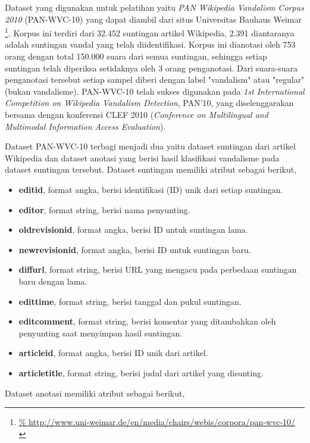 Dataset yang digunakan untuk pelatihan yaitu \textit{PAN Wikipedia Vandalism
Corpus 2010} (PAN-WVC-10)
\parencite{potthast:2010b}
yang dapat diambil dari situs Universitas Bauhaus Weimar
\footnote{%
	\RaggedRight\url{%
http://www.uni-weimar.de/en/media/chairs/webis/corpora/pan-wvc-10/
}}.
Korpus ini terdiri dari 32.452 suntingan artikel Wikipedia, 2.391 diantaranya
adalah suntingan vandal yang telah diidentifikasi.
Korpus ini dianotasi oleh 753 orang dengan total 150.000 suara dari semua
suntingan, sehingga setiap suntingan telah diperiksa setidaknya oleh 3 orang
penganotasi.
Dari suara-suara penganotasi tersebut setiap sampel diberi dengan label
"vandalism" atau "regular" (bukan vandalisme).
PAN-WVC-10 telah sukses digunakan pada \textit{1st International Competition on
Wikipedia Vandalism Detection}, PAN'10, yang diselenggarakan bersama dengan
konferensi CLEF 2010 (\textit{Conference on Multilingual and Multimodal
Information Access Evaluation}).

Dataset PAN-WVC-10 terbagi menjadi dua yaitu dataset suntingan dari artikel
Wikipedia dan dataset anotasi yang berisi hasil klasifikasi vandalisme pada
dataset suntingan tersebut.
Dataset suntingan memiliki atribut sebagai berikut,

\begin{itemize}
	\item \textbf{editid}, format angka, berisi identifikasi (ID) unik dari setiap suntingan.
	\item \textbf{editor}, format string, berisi nama penyunting.
	\item \textbf{oldrevisionid}, format angka, berisi ID untuk suntingan lama.
	\item \textbf{newrevisionid}, format angka, berisi ID untuk suntingan baru.
	\item \textbf{diffurl}, format string, berisi URL yang mengacu pada perbedaan suntingan baru dengan lama.
	\item \textbf{edittime}, format string, berisi tanggal dan pukul
	suntingan.
	\item \textbf{editcomment}, format string, berisi komentar yang ditambahkan oleh penyunting saat menyimpan hasil suntingan.
	\item \textbf{articleid}, format angka, berisi ID unik dari artikel.
	\item \textbf{articletitle}, format string, berisi judul dari artikel yang disunting.
\end{itemize}

Dataset anotasi memiliki atribut sebagai berikut,

